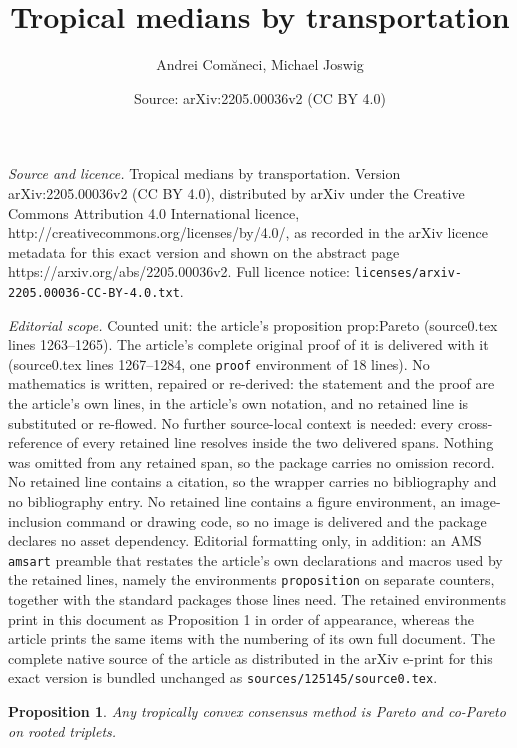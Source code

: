 \documentclass[10pt,a4paper]{amsart}
\title{Tropical medians by transportation}
\author{Andrei Com\u{a}neci, Michael Joswig}
\date{Source: arXiv:2205.00036v2 (CC BY 4.0)}
\newtheorem{proposition}{Proposition}
\begin{document}
\maketitle

\noindent\emph{Source and licence.} Tropical medians by transportation. Version arXiv:2205.00036v2 (CC BY 4.0), distributed by arXiv under the Creative Commons Attribution 4.0 International licence, http://creativecommons.org/licenses/by/4.0/, as recorded in the arXiv licence metadata for this exact version and shown on the abstract page https://arxiv.org/abs/2205.00036v2. Full licence notice: \texttt{licenses/arxiv-2205.00036-CC-BY-4.0.txt}.\par\smallskip

\noindent\textit{Editorial scope.} Counted unit: the article's proposition prop:Pareto (source0.tex lines 1263--1265). The article's complete original proof of it is delivered with it (source0.tex lines 1267--1284, one \texttt{proof} environment of 18 lines). No mathematics is written, repaired or re-derived: the statement and the proof are the article's own lines, in the article's own notation, and no retained line is substituted or re-flowed.  No further source-local context is needed: every cross-reference of every retained line resolves inside the two delivered spans.  Nothing was omitted from any retained span, so the package carries no omission record.  No retained line contains a citation, so the wrapper carries no bibliography and no bibliography entry.  No retained line contains a figure environment, an image-inclusion command or drawing code, so no image is delivered and the package declares no asset dependency.  Editorial formatting only, in addition: an AMS \texttt{amsart} preamble that restates the article's own declarations and macros used by the retained lines, namely the environments \texttt{proposition} on separate counters, together with the standard packages those lines need.  The retained environments print in this document as Proposition 1 in order of appearance, whereas the article prints the same items with the numbering of its own full document.  The complete native source of the article as distributed in the arXiv e-print for this exact version is bundled unchanged as \texttt{sources/125145/source0.tex}.
\begin{proposition} \label{prop:Pareto}
  Any tropically convex consensus method is Pareto and co-Pareto on rooted triplets.
\end{proposition}
\end{document}
